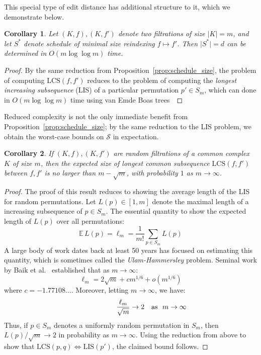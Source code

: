 \documentclass[sn-mathphys]{sn-jnl}
\newtheorem{corollary}{Corollary}
\begin{document}
This special type of edit distance has additional structure to it, which we demonstrate below.  
\begin{corollary}\label{cor:lis_schedule_complexity}
Let $(K, f), (K, f')$ denote two filtrations of size $\lvert K \rvert = m$, and let $S^*$ denote schedule of minimal size reindexing $f \mapsto f'$. Then $\lvert S^\ast \rvert = d$ can be determined in $O(m \log \log m)$ time. 
\end{corollary}
\begin{proof} \normalsize
	By the same reduction from Proposition~\ref{prop:schedule_size}, the problem of computing $\mathrm{LCS}(f, f')$ reduces to the problem of computing the \emph{longest increasing subsequence} (LIS) of a particular permutation $p' \in S_m$, which can done in $O( m \log \log m)$ time using van Emde Boas trees~\cite{bespamyatnikh2000enumerating}
\end{proof}
\noindent 
Reduced complexity is not the only immediate benefit from Proposition~\ref{prop:schedule_size}; by the same reduction to the LIS problem, we obtain the worst-case bounds on $\mathcal{S}$ in expectation. 
\begin{corollary}\label{cor:expectation}
If $(K, f), (K,f')$ are random filtrations of a common complex $K$ of size $m$, then the expected size of longest common subsequence $\mathrm{LCS}(f, f')$ between $f,f'$ is no larger than $m - \sqrt{m}$, with probability $1$ as $m \to \infty$. 
\end{corollary}
\begin{proof} \normalsize
	The proof of this result reduces to showing the average length of the LIS for random permutations. Let $L(p) \in [1,m]$ denote the maximal length of a increasing subsequence of $p \in S_m$. 
	The essential quantity to show the expected length of $L(p)$ over all permutations: 
	$$ \mathbb{E} \, L(p) = \ell_m = \frac{1}{m!} \sum\limits_{p \in S_m} L(p)$$
	A large body of work dates back at least 50 years has focused on estimating this quantity, which is sometimes called the \emph{Ulam-Hammersley} problem. Seminal work by Baik et al.~\cite{baik1999distribution} established that as $m \to \infty$:
	$$ \displaystyle \ell_m = 2 \sqrt{m} + c m^{1/6} + o(m^{1/6}) $$
where $c = -1.77108...$. Moreover, letting $m \to \infty$, we have: 
$$ \frac{\ell_m}{\sqrt{m}} \to 2\rlap{\quad \text{as } $m \to \infty$} $$	 
Thus, if $p \in S_m$ denotes a uniformly random permutation in $S_m$, then $L(p)/\sqrt{m} \to 2$ in probability as $m \to \infty$. Using the reduction from above to show that $\mathrm{LCS}(p,q) \Leftrightarrow \mathrm{LIS}(p')$, the claimed bound follows.
\end{proof}
\end{document}
